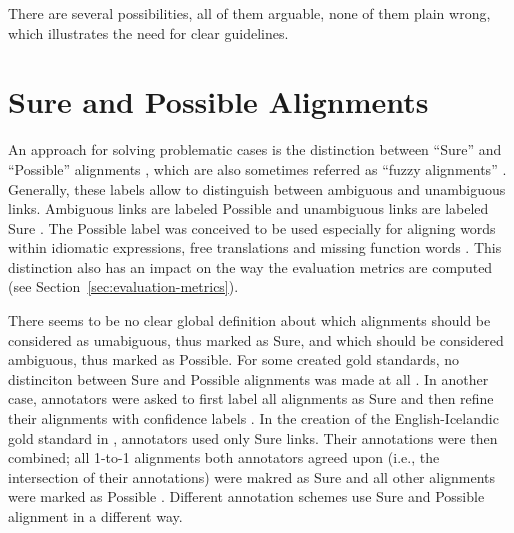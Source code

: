 There are several possibilities, all of them arguable, none of them plain wrong, which illustrates the need for clear guidelines.

\section{Sure and Possible Alignments}
\label{sec:sure_possible}
An approach for solving problematic cases is the distinction between \enquote{Sure} and \enquote{Possible} alignments \autocite{och-ney-2000-improved}, which are also sometimes referred as \enquote{fuzzy alignments} \autocite{clematide2018}. 
Generally, these labels allow to distinguish between ambiguous and unambiguous links. 
Ambiguous links are labeled Possible and unambiguous links are labeled Sure \autocite{lambert2005}. 
The Possible label was conceived to be used especially for aligning words within idiomatic expressions, free translations and missing function words \autocite{och-ney-2000-improved}.
This distinction also has an impact on the way the evaluation metrics are computed (see Section~\ref{sec:evaluation-metrics}).

There seems to be no clear global definition about which alignments should be considered as umabiguous, thus marked as Sure, and which should be considered ambiguous, thus marked as Possible. 
For some created gold standards, no distinciton between Sure and Possible alignments was made at all \autocite{clematide2018}. 
In another case, annotators were asked to first label all alignments as Sure and then refine their alignments with confidence labels \autocite{holmqvist-ahrenberg-2011-gold}. 
In the creation of the English-Icelandic gold standard in \cite{steingrimsson-etal-2021-combalign},  annotators used only Sure links. 
Their annotations were then combined; all 1-to-1 alignments both annotators agreed upon (i.e., the intersection of their annotations) were makred as Sure and all other alignments were marked as Possible \autocite{steingrimsson-etal-2021-combalign}. Different annotation schemes use Sure and Possible alignment in a different way.


